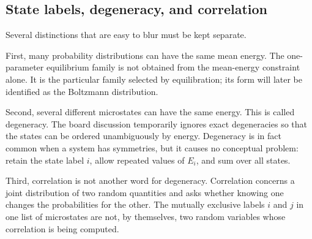 \begin{classroomqa}
\end{classroomqa}

\subsection{State labels, degeneracy, and correlation}

Several distinctions that are easy to blur must be kept separate.

First, many probability distributions can have the same mean energy. The
one-parameter equilibrium family is not obtained from the mean-energy
constraint alone. It is the particular family selected by equilibration; its
form will later be identified as the Boltzmann distribution.

Second, several different microstates can have the same energy. This is called
degeneracy. The board discussion temporarily ignores exact degeneracies so
that the states can be ordered unambiguously by energy. Degeneracy is in fact
common when a system has symmetries, but it causes no conceptual problem:
retain the state label \(i\), allow repeated values of \(E_i\), and sum over
all states.

Third, correlation is not another word for degeneracy. Correlation concerns a
joint distribution of two random quantities and asks whether knowing one
changes the probabilities for the other. The mutually exclusive labels
\(i\) and \(j\) in one list of microstates are not, by themselves, two random
variables whose correlation is being computed.

\begin{classroomqa}
\end{classroomqa}


